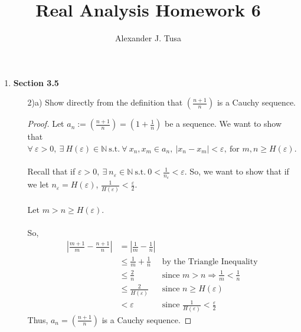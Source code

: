 \documentclass[12pt,letterpaper]{article}
\author{Alexander J. Tusa}
\title{Real Analysis Homework 6}
\newcommand{\st}{\ \text{s.t.}\ }
\newcommand{\abs}[1]{\left\lvert #1 \right\rvert}
\newcommand{\N}{\mathbb{N}}
\theoremstyle{case}
\theoremstyle{definition}
\begin{document}
	\maketitle
	\begin{enumerate}
		\item \textbf{Section 3.5}
		\begin{enumerate}
			\item[2)a)] Show directly from the definition that $\left(\frac{n+1}{n}\right)$ is a Cauchy sequence.
			
			\begin{proof}
				Let $a_n:=(\frac{n+1}{n})=(1+\frac{1}{n})$ be a sequence. We want to show that $\forall\ \varepsilon > 0,\ \exists\ H(\varepsilon) \in \N \st \forall\ x_n,x_m \in a_n,\ |x_n-x_m|<\varepsilon,\ \text{for } m,n \geq H(\varepsilon)$.
				\\\\Recall that if $\varepsilon > 0,\ \exists\ n_\varepsilon \in \N \st 0<\frac{1}{n_\varepsilon}<\varepsilon$. So, we want to show that if we let $n_\varepsilon=H(\varepsilon)$, $\frac{1}{H(\varepsilon)}<\frac{\varepsilon}{2}$.
				\\\\Let $m>n \geq H(\varepsilon)$.
				\\\\So,
				\begin{align*}
					\abs{\frac{m+1}{m}-\frac{n+1}{n}}&=\abs{\frac{1}{m}-\frac{1}{n}} \\
					&\leq \frac{1}{m}+\frac{1}{n} &\text{by the Triangle Inequality} \\
					&\leq \frac{2}{n} &\text{since } m>n \Rightarrow \frac{1}{m}<\frac{1}{n} \\
					&\leq \frac{2}{H(\varepsilon)} &\text{since } n \geq H(\varepsilon) \\
					&< \varepsilon &\text{since } \frac{1}{H(\varepsilon)} < \frac{\varepsilon}{2}
				\end{align*}
				Thus, $a_n=(\frac{n+1}{n})$ is a Cauchy sequence.
			\end{proof}
			

\end{enumerate}
\end{enumerate}
\end{document}
